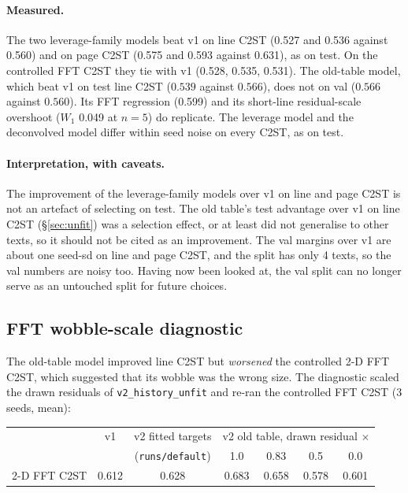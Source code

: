 \documentclass[11pt,a4paper]{article}
\begin{document}
\paragraph{Measured.} The two leverage-family models beat v1 on line C2ST
(0.527 and 0.536 against 0.560) and on page C2ST (0.575 and 0.593 against
0.631), as on test. On the controlled FFT C2ST they tie with v1 (0.528, 0.535,
0.531). The old-table model, which beat v1 on test line C2ST ($0.539$ against
$0.566$), does not on val ($0.566$ against $0.560$). Its FFT regression
(0.599) and its short-line residual-scale overshoot ($W_1$ 0.049 at $n=5$) do
replicate. The leverage model and the deconvolved model differ within seed
noise on every C2ST, as on test.

\paragraph{Interpretation, with caveats.} The improvement of the
leverage-family models over v1 on line and page C2ST is not an artefact of
selecting on test. The old table's test advantage over v1 on line C2ST
(\S\ref{sec:unfit}) was a selection effect, or at least did not generalise to
other texts, so it should not be cited as an improvement. The val margins over
v1 are about one seed-sd on line and page C2ST, and the split has only 4
texts, so the val numbers are noisy too. Having now been looked at, the val
split can no longer serve as an untouched split for future choices.

\subsection{FFT wobble-scale diagnostic}
\label{sec:fftdiag}
The old-table model improved line C2ST but \emph{worsened} the controlled 2-D
FFT C2ST, which suggested that its wobble was the wrong size. The diagnostic
scaled the drawn residuals of \texttt{v2\_history\_unfit} and re-ran the
controlled FFT C2ST (3 seeds, mean):
\begin{center}
\begin{tabular}{lcccccc}
\toprule
& v1 & v2 fitted targets & \multicolumn{4}{c}{v2 old table, drawn residual $\times$}\\
& & (\texttt{runs/default}) & 1.0 & 0.83 & 0.5 & 0.0\\
\midrule
2-D FFT C2ST & 0.612 & 0.628 & 0.683 & 0.658 & 0.578 & 0.601\\
\bottomrule
\end{tabular}
\end{center}
\end{document}
